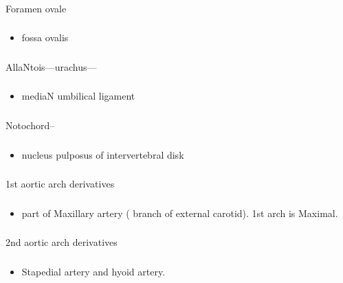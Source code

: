 \documentclass[11pt]{beamer}
\begin{document}
\begin{frame}
 \frametitle{}
Foramen ovale
\end{frame}

\begin{frame}
 \frametitle{}
\begin{itemize}
\item{fossa ovalis}
\end{itemize}
\end{frame}

\begin{frame}
 \frametitle{}
AllaNtois––urachus––
\end{frame}

\begin{frame}
 \frametitle{}
\begin{itemize}
\item{mediaN umbilical ligament}
\end{itemize}
\end{frame}

\begin{frame}
 \frametitle{}
Notochord–
\end{frame}

\begin{frame}
 \frametitle{}
\begin{itemize}
\item{nucleus pulposus of intervertebral disk}
\end{itemize}
\end{frame}

\begin{frame}
 \frametitle{}
1st aortic arch derivatives 
\end{frame}

\begin{frame}
 \frametitle{}
\begin{itemize}
\item{part of Maxillary artery ( branch of external carotid). 1st arch is Maximal. }
\end{itemize}
\end{frame}

\begin{frame}
 \frametitle{}
2nd aortic arch derivatives 
\end{frame}

\begin{frame}
 \frametitle{}
\begin{itemize}
\item{Stapedial artery and hyoid artery.}
\end{itemize}
\end{frame}
\end{document}
